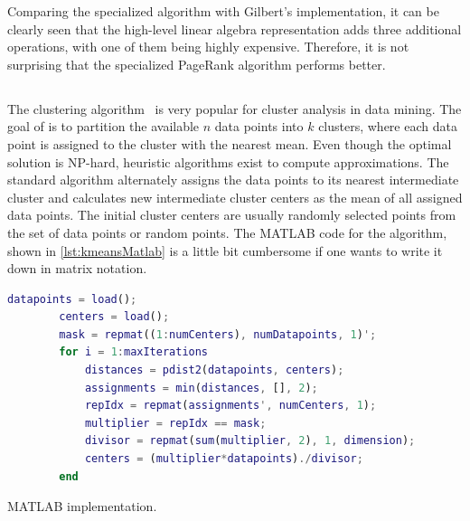 Comparing the specialized algorithm with Gilbert's implementation, it can be clearly seen that the high-level linear algebra representation adds three additional operations, with one of them being highly expensive.
Therefore, it is not surprising that the specialized PageRank algorithm performs better.

\subsection{\kmeans}

The \kmeans clustering algorithm~\cite{macqueen:1967a} is very popular for cluster analysis in data mining.
The goal of \kmeans is to partition the available $n$ data points into $k$ clusters, where each data point is assigned to the cluster with the nearest mean.
Even though the optimal solution is NP-hard, heuristic algorithms exist to compute approximations.
The standard algorithm alternately assigns the data points to its nearest intermediate cluster and calculates new intermediate cluster centers as the mean of all assigned data points.
The initial cluster centers are usually randomly selected points from the set of data points or random points.
The MATLAB code for the \kmeans algorithm, shown in \cref{lst:kmeansMatlab} is a little bit cumbersome if one wants to write it down in matrix notation.

\begin{listing}
	\begin{CenteredBox}
		\begin{lstlisting}[language=Matlab]
		datapoints = load();
		centers = load();
		mask = repmat((1:numCenters), numDatapoints, 1)';
		for i = 1:maxIterations
  			distances = pdist2(datapoints, centers);
  			assignments = min(distances, [], 2);
  			repIdx = repmat(assignments', numCenters, 1);
  			multiplier = repIdx == mask;
  			divisor = repmat(sum(multiplier, 2), 1, dimension);
  			centers = (multiplier*datapoints)./divisor;
		end
		\end{lstlisting}
	\end{CenteredBox}
	\caption{MATLAB \kmeans implementation.}
	\label{lst:kmeansMatlab}
\end{listing}

